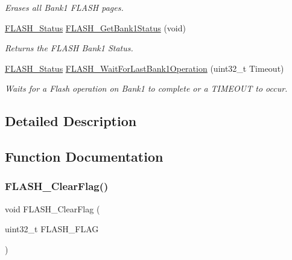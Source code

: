 \begin{DoxyCompactItemize}
\begin{DoxyCompactList}\small\item\em Erases all Bank1 F\+L\+A\+SH pages. \end{DoxyCompactList}\item 
\hyperlink{group___f_l_a_s_h___exported___types_gadc63a6f3404ff1f71229a66915e9cdc0}{F\+L\+A\+S\+H\+\_\+\+Status} \hyperlink{group___f_l_a_s_h___exported___functions_ga9d5b76b75ef4c578cc45dc836a1929b6}{F\+L\+A\+S\+H\+\_\+\+Get\+Bank1\+Status} (void)
\begin{DoxyCompactList}\small\item\em Returns the F\+L\+A\+SH Bank1 Status. \end{DoxyCompactList}\item 
\hyperlink{group___f_l_a_s_h___exported___types_gadc63a6f3404ff1f71229a66915e9cdc0}{F\+L\+A\+S\+H\+\_\+\+Status} \hyperlink{group___f_l_a_s_h___exported___functions_ga470d345c2ea4304f899aa988bdd23824}{F\+L\+A\+S\+H\+\_\+\+Wait\+For\+Last\+Bank1\+Operation} (uint32\+\_\+t Timeout)
\begin{DoxyCompactList}\small\item\em Waits for a Flash operation on Bank1 to complete or a T\+I\+M\+E\+O\+UT to occur. \end{DoxyCompactList}\end{DoxyCompactItemize}


\subsection{Detailed Description}


\subsection{Function Documentation}
\mbox{\label{group___f_l_a_s_h___exported___functions_gac4be1d486483fa5cd70ec77d44ca8f87}} 
\subsubsection{\texorpdfstring{F\+L\+A\+S\+H\+\_\+\+Clear\+Flag()}{FLASH\_ClearFlag()}}
{\footnotesize\ttfamily void F\+L\+A\+S\+H\+\_\+\+Clear\+Flag (\begin{DoxyParamCaption}\item[{uint32\+\_\+t}]{F\+L\+A\+S\+H\+\_\+\+F\+L\+AG }\end{DoxyParamCaption})}




